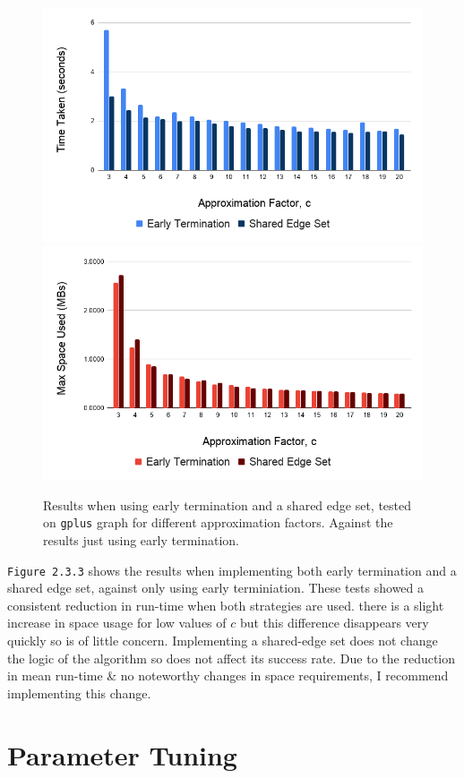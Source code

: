 \documentclass[11pt,twoside,a4paper]{report}
\begin{document}
\begin{figure}[H]
	\label{Figure 4}
	\includegraphics[width=.5\textwidth]{img/gplusSharedEdgeSetTime.png}
	\includegraphics[width=.5\textwidth]{img/gplusSharedEdgeSetSpace.png}
	\caption{Results when using early termination and a shared edge set, tested on \texttt{gplus} graph for different approximation factors. Against the results just using early termination.}
\end{figure}

\par \texttt{Figure 2.3.3} shows the results when implementing both early termination and a shared edge set, against only using early terminiation. These tests showed a consistent reduction in run-time when both strategies are used. there is a slight increase in space usage for low values of $c$ but this difference disappears very quickly so is of little concern. Implementing a shared-edge set does not change the logic of the algorithm so does not affect its success rate. Due to the reduction in mean run-time \& no noteworthy changes in space requirements, I recommend implementing this change.

\section{Parameter Tuning}

\end{document}
